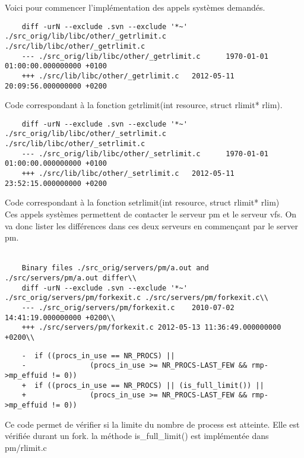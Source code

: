 \documentclass[9pt , a4paper]{report}
\begin{document}
	Voici pour commencer l'implémentation des appels systèmes demandés.\\
	\begin{lstlisting}														 
	diff -urN --exclude .svn --exclude '*~' ./src_orig/lib/libc/other/_getrlimit.c ./src/lib/libc/other/_getrlimit.c
	--- ./src_orig/lib/libc/other/_getrlimit.c      1970-01-01 01:00:00.000000000 +0100
	+++ ./src/lib/libc/other/_getrlimit.c   2012-05-11 20:09:56.000000000 +0200
	\end{lstlisting}
	Code correspondant à la fonction getrlimit(int resource, struct rlimit* rlim). \\ 
	\begin{lstlisting}
	diff -urN --exclude .svn --exclude '*~' ./src_orig/lib/libc/other/_setrlimit.c ./src/lib/libc/other/_setrlimit.c
	--- ./src_orig/lib/libc/other/_setrlimit.c      1970-01-01 01:00:00.000000000 +0100
	+++ ./src/lib/libc/other/_setrlimit.c   2012-05-11 23:52:15.000000000 +0200
	\end{lstlisting}
	Code correspondant à la fonction setrlimit(int resource, struct rlimit* rlim) \\
	Ces appels systèmes permettent de contacter le serveur pm et le serveur vfs. On va donc lister les différences dans ces 	deux serveurs en commençant par le server pm. 
	\\ \\
	\begin{lstlisting}
	Binary files ./src_orig/servers/pm/a.out and ./src/servers/pm/a.out differ\\
	diff -urN --exclude .svn --exclude '*~' ./src_orig/servers/pm/forkexit.c ./src/servers/pm/forkexit.c\\
	--- ./src_orig/servers/pm/forkexit.c    2010-07-02 14:41:19.000000000 +0200\\
	+++ ./src/servers/pm/forkexit.c 2012-05-13 11:36:49.000000000 +0200\\ 
	\end{lstlisting}
	\begin{lstlisting}
	-  if ((procs_in_use == NR_PROCS) || 
	-               (procs_in_use >= NR_PROCS-LAST_FEW && rmp->mp_effuid != 0))
	+  if ((procs_in_use == NR_PROCS) || (is_full_limit()) || 
	+               (procs_in_use >= NR_PROCS-LAST_FEW && rmp->mp_effuid != 0))
    	 \end{lstlisting}

	Ce code permet de vérifier si la limite du nombre de process est atteinte. Elle est vérifiée durant un fork. la méthode is\_full\_limit() est implémentée dans pm/rlimit.c
\end{document}
